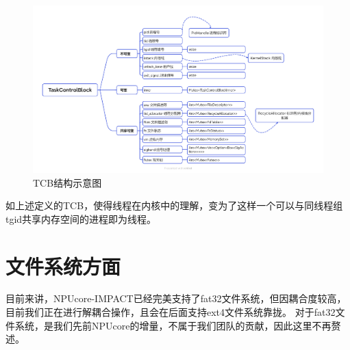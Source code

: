 \begin{figure}[h]
    \centering
    \includegraphics[width=1\linewidth]{figs/TCBBlock.png}
    \caption{TCB结构示意图}
    \label{TCB结构示意图}
\end{figure}

如上述定义的TCB，使得线程在内核中的理解，变为了这样一个可以与同线程组tgid共享内存空间的进程即为线程。

\section{文件系统方面}

目前来讲，NPUcore-IMPACT已经完美支持了fat32文件系统，但因耦合度较高，目前我们正在进行解耦合操作，且会在后面支持ext4文件系统靠拢。
对于fat32文件系统，是我们先前NPUcore的增量，不属于我们团队的贡献，因此这里不再赘述。

